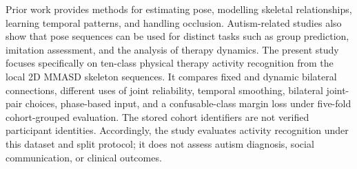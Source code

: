 Prior work provides methods for estimating pose, modelling skeletal relationships, learning temporal patterns, and handling occlusion. Autism-related studies also show that pose sequences can be used for distinct tasks such as group prediction, imitation assessment, and the analysis of therapy dynamics. The present study focuses specifically on ten-class physical therapy activity recognition from the local 2D MMASD skeleton sequences. It compares fixed and dynamic bilateral connections, different uses of joint reliability, temporal smoothing, bilateral joint-pair choices, phase-based input, and a confusable-class margin loss under five-fold cohort-grouped evaluation. The stored cohort identifiers are not verified participant identities. Accordingly, the study evaluates activity recognition under this dataset and split protocol; it does not assess autism diagnosis, social communication, or clinical outcomes.
